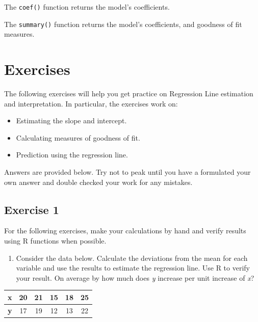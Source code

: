 \documentclass[
  letterpaper,
  DIV=11,
  numbers=noendperiod]{scrreprt}
\providecommand{\tightlist}{%
  \setlength{\itemsep}{0pt}\setlength{\parskip}{0pt}}\usepackage{longtable,booktabs,array}
\begin{document}
The \texttt{coef()} function returns the model's coefficients.

The \texttt{summary()} function returns the model's coefficients, and
goodness of fit measures.

\hypertarget{exercises-6}{%
\section{Exercises}\label{exercises-6}}

The following exercises will help you get practice on Regression Line
estimation and interpretation. In particular, the exercises work on:

\begin{itemize}
\item
  Estimating the slope and intercept.
\item
  Calculating measures of goodness of fit.
\item
  Prediction using the regression line.
\end{itemize}

Answers are provided below. Try not to peak until you have a formulated
your own answer and double checked your work for any mistakes.

\hypertarget{exercise-1-12}{%
\subsection*{Exercise 1}\label{exercise-1-12}}

For the following exercises, make your calculations by hand and verify
results using R functions when possible.

\begin{enumerate}
\def\labelenumi{\arabic{enumi}.}
\tightlist
\item
  Consider the data below. Calculate the deviations from the mean for
  each variable and use the results to estimate the regression line. Use
  R to verify your result. On average by how much does \emph{y} increase
  per unit increase of \emph{x}?
\end{enumerate}

\begin{longtable}[]{@{}cccccc@{}}
\toprule()
\textbf{x} & 20 & 21 & 15 & 18 & 25 \\
\midrule()
\endhead
\textbf{y} & 17 & 19 & 12 & 13 & 22 \\
\bottomrule()
\end{longtable}
\end{document}
